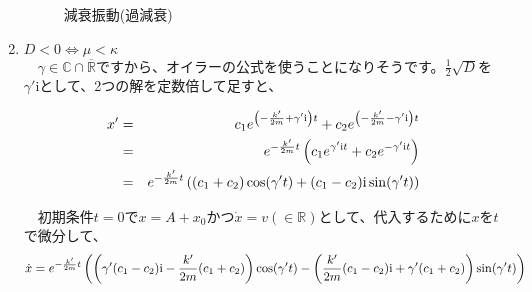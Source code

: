 \begin{enumerate}
\begin{figure}[htbp]
\begin{center}
            \caption{減衰振動(過減衰)}
            \end{center}
            \end{figure}
            
            
            
    \item $D < 0\Leftrightarrow \mu < \kappa$ \\
            　$\gamma\in\mathbb{C}\cap\overline{\mathbb{R}}$ですから、オイラーの公式を使うことになりそうです。$\frac{1}{2}\sqrt{D}$を$\gamma'\mathrm{i}$として、2つの解を定数倍して足すと、
            
            \begin{eqnarray}
                x' &=& c_1e^{\left(-\frac{k'}{2m}+\gamma'\mathrm{i}\right)t} + c_2e^{\left(-\frac{k'}{2m}-\gamma'\mathrm{i}\right)t} \notag \\
                   &=& e^{-\frac{k'}{2m}t}\left(c_1 e^{\gamma'\mathrm{i}t}+c_2 e^{-\gamma'\mathrm{i}t}\right) \notag \\
                   &=& e^{-\frac{k'}{2m}t}\left((c_1+c_2)\cos(\gamma't)+(c_1-c_2)\mathrm{i}\sin(\gamma't)\right) \notag 
            \end{eqnarray}
            
            　初期条件$t=0$で$x=A+x_0$かつ$\dot{x}=v(\in\mathbb{R})$として、代入するために$x$を$t$で微分して、
            　
            \begin{eqnarray}
                \dot{x} = e^{-\frac{k'}{2m}t}\left(\left(\gamma'(c_1-c_2)\mathrm{i}-\frac{k'}{2m}(c_1+c_2)\right)\cos(\gamma't)-\left(\frac{k'}{2m}(c_1-c_2)\mathrm{i}+\gamma'(c_1+c_2)\right)\sin(\gamma't)\right) \notag
            \end{eqnarray}
            

\end{enumerate}
